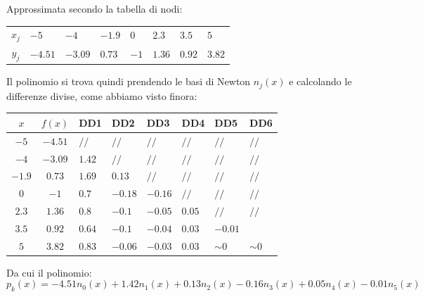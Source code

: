 \documentclass[a4paper,11pt]{article}
\begin{document}
Approssimata secondo la tabella di nodi:
\begin{table}[H]
	\center
	\begin{tabular} { c | p{1cm} p{1cm} p{1cm} p{1cm} p{1cm} p{1cm} p{1cm} }
		$x_j$ & $-5$ & $-4$ & $-1.9$ & $0$ & $2.3$ & $3.5$ & $5$ \\
		$y_j$ & $-4.51$ & $-3.09$ & $0.73$ & $-1$ & $1.36$ & $0.92$ & $3.82$
	\end{tabular}
\end{table}

Il polinomio si trova quindi prendendo le basi di Newton $n_j(x)$ e calcolando le differenze divise, come abbiamo visto finora:

\begin{table}[H]
	\center 
	\begin{tabular} { c | c | p{1cm} p{1cm} p{1cm} p{1cm} p{1cm} p{1cm} }
		$x$ & $f(x)$ & DD1 & DD2 & DD3 & DD4 & DD5 & DD6 \\
		\hline
		$-5 $ & $ -4.51 $ & $ // $ & $ // $ & $ // $ & $ // $ & $ // $ & $ // $ \\
		$-4 $ & $ -3.09 $ & $ 1.42 $ & $ // $ & $ // $ & $ // $ & $ // $ & $ // $ \\
		$-1.9 $ & $ 0.73 $ & $ 1.69 $ & $ 0.13 $ & $ // $ & $ // $ & $ // $ & $ // $ \\
		$0 $ & $ -1 $ & $ 0.7 $ & $ -0.18 $ & $ -0.16 $ & $ // $ & $ // $ & $ // $ \\
		$2.3 $ & $ 1.36 $ & $ 0.8 $ & $ -0.1 $ & $ -0.05 $ & $ 0.05 $ & $ // $ & $ // $ \\
		$3.5 $ & $ 0.92 $ & $ 0.64 $ & $ -0.1 $ & $ -0.04 $ & $ 0.03 $ & $ -0.01 $ \\
		$5 $ & $ 3.82 $ & $ 0.83 $ & $ -0.06 $ & $ -0.03 $ & $ 0.03 $ & $ \sim0 $ & $ \sim0$ 
	\end{tabular}
\end{table}

Da cui il polinomio:
$$
p_k(x) = -4.51 n_0(x) + 1.42 n_1(x) + 0.13 n_2(x) - 0.16 n_3(x) + 0.05 n_4(x) - 0.01 n_5(x)
$$

\par\medskip
\noindent
\end{document}

